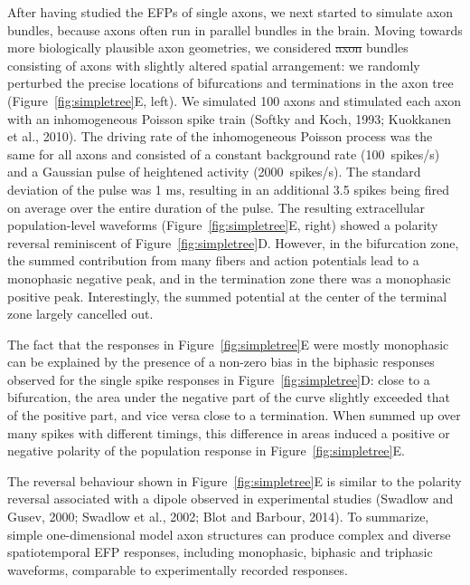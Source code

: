 \documentclass[]{article}
\providecommand{\DIFaddtex}[1]{{\protect\color{blue}\uwave{#1}}} %
\providecommand{\DIFdeltex}[1]{{\protect\color{red}\sout{#1}}}                      %
\providecommand{\DIFaddbegin}{} %
\providecommand{\DIFaddend}{} %
\providecommand{\DIFdelbegin}{} %
\providecommand{\DIFdelend}{} %
\providecommand{\DIFadd}[1]{\texorpdfstring{\DIFaddtex{#1}}{#1}} %
\providecommand{\DIFdel}[1]{\texorpdfstring{\DIFdeltex{#1}}{}} %
\begin{document}
After having studied the EFPs of single axons, we next started to
simulate axon bundles, because axons often run in parallel bundles in
the brain. Moving towards more biologically plausible axon geometries,
we considered \DIFdelbegin \DIFdel{axon }\DIFdelend bundles consisting of axons with slightly altered spatial
arrangement: we randomly perturbed the precise locations of bifurcations
and terminations in the axon tree (Figure~\ref{fig:simpletree}E, left\DIFaddbegin \DIFadd{;
for details, see Materials and Methods}\DIFaddend ). We simulated 100 axons and
stimulated each axon with an inhomogeneous Poisson spike train (Softky
and Koch, 1993; Kuokkanen et al., 2010). The driving rate of the
inhomogeneous Poisson process was the same for all axons and consisted
of a constant background rate (100~spikes/s) and a Gaussian pulse of
heightened activity (2000~spikes/s). The standard deviation of the pulse
was 1 ms, resulting in an additional 3.5 spikes \DIFaddbegin \DIFadd{per axon }\DIFaddend being fired on
average over the entire duration of the pulse. The resulting
extracellular population-level waveforms (Figure~\ref{fig:simpletree}E,
right) showed a polarity reversal reminiscent of
Figure~\ref{fig:simpletree}D. However, in the bifurcation zone, the
summed contribution from many fibers and action potentials lead to a
monophasic negative peak, and in the termination zone there was a
monophasic positive peak. Interestingly, the summed potential at the
center of the terminal zone largely cancelled out.

The fact that the responses in Figure~\ref{fig:simpletree}E were mostly
monophasic can be explained by the presence of a non-zero bias in the
biphasic responses observed for the single spike responses in
Figure~\ref{fig:simpletree}D: close to a bifurcation, the area under the
negative part of the curve slightly exceeded that of the positive part,
and vice versa close to a termination. When summed up over many spikes
with different timings, this difference in areas induced a positive or
negative polarity of the population response in
Figure~\ref{fig:simpletree}E.

The reversal behaviour shown in Figure~\ref{fig:simpletree}E is similar
to the polarity reversal associated with a dipole observed in
experimental studies (Swadlow and Gusev, 2000; Swadlow et al., 2002;
Blot and Barbour, 2014). To summarize, simple one-dimensional model axon
structures can produce complex and diverse spatiotemporal EFP responses,
including monophasic, biphasic and triphasic waveforms, comparable to
experimentally recorded responses.
\end{document}
